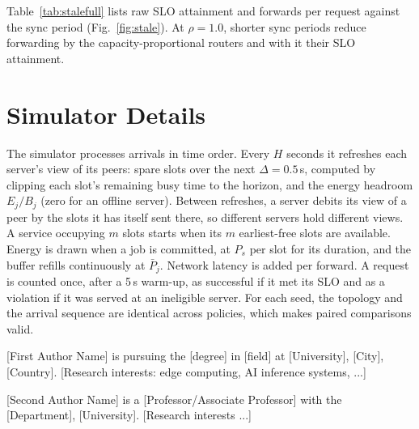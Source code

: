 \documentclass[journal]{IEEEtran}
\begin{document}
\begin{table}[h]
\centering
\caption{Compliant SLO attainment of the energy-aware variants ($\rho=0.8$, 10 seeds).}\label{tab:energyfull}
\resizebox{\columnwidth}{!}{%
}
\end{table}

Table~\ref{tab:stalefull} lists raw SLO attainment and forwards per request against the sync period (Fig.~\ref{fig:stale}). At $\rho=1.0$, shorter sync periods reduce forwarding by the capacity-proportional routers and with it their SLO attainment.

\begin{table}[h]
\centering
\caption{Raw SLO attainment and forwards per request vs.\ sync period $H$ (10 seeds).}\label{tab:stalefull}
\resizebox{\columnwidth}{!}{%
}
\end{table}

\section{Simulator Details}\label{app:sim}
The simulator processes arrivals in time order. Every $H$ seconds it refreshes each server's view of its peers: spare slots over the next $\Delta=0.5$\,s, computed by clipping each slot's remaining busy time to the horizon, and the energy headroom $E_j/B_j$ (zero for an offline server). Between refreshes, a server debits its view of a peer by the slots it has itself sent there, so different servers hold different views. A service occupying $m$ slots starts when its $m$ earliest-free slots are available. Energy is drawn when a job is committed, at $P_s$ per slot for its duration, and the buffer refills continuously at $\bar P_j$. Network latency is added per forward. A request is counted once, after a 5\,s warm-up, as successful if it met its SLO and as a violation if it was served at an ineligible server. For each seed, the topology and the arrival sequence are identical across policies, which makes paired comparisons valid.

\begin{IEEEbiographynophoto}{[First Author Name]}
is pursuing the [degree] in [field] at [University], [City], [Country]. [Research interests: edge computing, AI inference systems, ...]
\end{IEEEbiographynophoto}

\begin{IEEEbiographynophoto}{[Second Author Name]}
is a [Professor/Associate Professor] with the [Department], [University]. [Research interests ...]
\end{IEEEbiographynophoto}
\end{document}
